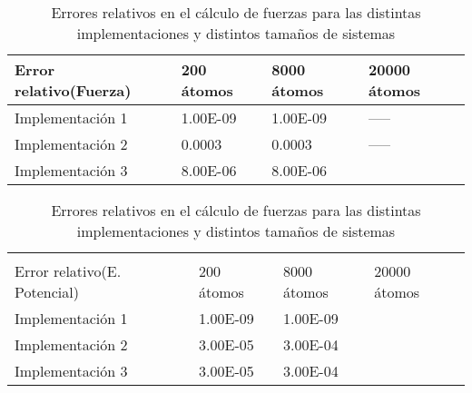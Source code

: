 \begin{table}[h]

\begin{minipage}{\linewidth}
\centering
\begin{tabular}{@{}llll@{}}

Error relativo(Fuerza)	 & 200 átomos            	& 8000 átomos        		& 20000 átomos \\ \bottomrule 
Implementación 1	 & 1.00E-09 			& 1.00E-09 			& 	-----	 \\ \hline
Implementación 2	 & 0.0003			& 0.0003			& 	-----	\\ \hline
Implementación 3	 & 8.00E-06 			& 8.00E-06			& 		 

\end{tabular}
\caption{Errores relativos en el cálculo de fuerzas para las distintas implementaciones y distintos tamaños de sistemas}
\label{tabla-errorRelativo-fuerzas}
\end{minipage}

\begin{minipage}{\linewidth}
\centering
\begin{tabular}{@{}llll@{}}
\\
\\
Error relativo(E. Potencial)	 & 200 átomos            	& 8000 átomos        		& 20000 átomos \\ \bottomrule 
Implementación 1	 & 1.00E-09 			& 1.00E-09 			& 		 \\ \hline
Implementación 2	 & 3.00E-05 			& 3.00E-04			&  		\\ \hline
Implementación 3	 & 3.00E-05	 		& 3.00E-04 			& 		 \\ \bottomrule

\end{tabular}
\end{minipage}
\caption{Errores relativos en el cálculo de fuerzas para las distintas implementaciones y distintos tamaños de sistemas}
\label{tabla-errorRelativo-potencial}
\end{table}


% 


